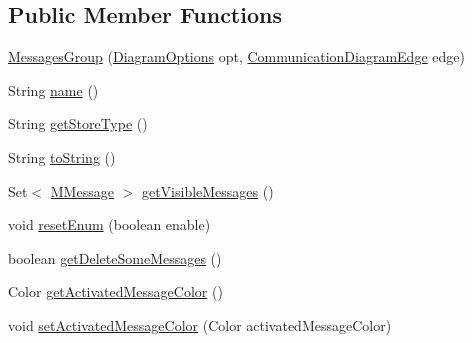 \subsection*{Public Member Functions}
\begin{DoxyCompactItemize}
\item 
\hyperlink{classorg_1_1tzi_1_1use_1_1gui_1_1views_1_1diagrams_1_1behavior_1_1communicationdiagram_1_1_messages_group_a96ee34da109285f43b0a4684df2dbf99}{Messages\-Group} (\hyperlink{classorg_1_1tzi_1_1use_1_1gui_1_1views_1_1diagrams_1_1_diagram_options}{Diagram\-Options} opt, \hyperlink{classorg_1_1tzi_1_1use_1_1gui_1_1views_1_1diagrams_1_1behavior_1_1communicationdiagram_1_1_communication_diagram_edge}{Communication\-Diagram\-Edge} edge)
\item 
String \hyperlink{classorg_1_1tzi_1_1use_1_1gui_1_1views_1_1diagrams_1_1behavior_1_1communicationdiagram_1_1_messages_group_ac38e5eafcc0a1f94152ba56a017633b4}{name} ()
\item 
String \hyperlink{classorg_1_1tzi_1_1use_1_1gui_1_1views_1_1diagrams_1_1behavior_1_1communicationdiagram_1_1_messages_group_aeeee23754e18fae33a8dede654129e87}{get\-Store\-Type} ()
\item 
String \hyperlink{classorg_1_1tzi_1_1use_1_1gui_1_1views_1_1diagrams_1_1behavior_1_1communicationdiagram_1_1_messages_group_ab1415787e2cc82791316c1c4a0603460}{to\-String} ()
\item 
Set$<$ \hyperlink{classorg_1_1tzi_1_1use_1_1gui_1_1views_1_1diagrams_1_1behavior_1_1communicationdiagram_1_1_m_message}{M\-Message} $>$ \hyperlink{classorg_1_1tzi_1_1use_1_1gui_1_1views_1_1diagrams_1_1behavior_1_1communicationdiagram_1_1_messages_group_a2d1b563b42959f839252a22a7a370135}{get\-Visible\-Messages} ()
\item 
void \hyperlink{classorg_1_1tzi_1_1use_1_1gui_1_1views_1_1diagrams_1_1behavior_1_1communicationdiagram_1_1_messages_group_a8d1683a2b391014221c414e44493b172}{reset\-Enum} (boolean enable)
\item 
boolean \hyperlink{classorg_1_1tzi_1_1use_1_1gui_1_1views_1_1diagrams_1_1behavior_1_1communicationdiagram_1_1_messages_group_a606a26cb9fc25be84af94153a8312f9d}{get\-Delete\-Some\-Messages} ()
\item 
Color \hyperlink{classorg_1_1tzi_1_1use_1_1gui_1_1views_1_1diagrams_1_1behavior_1_1communicationdiagram_1_1_messages_group_ac254a62aef76371924c1cedb1a881156}{get\-Activated\-Message\-Color} ()
\item 
void \hyperlink{classorg_1_1tzi_1_1use_1_1gui_1_1views_1_1diagrams_1_1behavior_1_1communicationdiagram_1_1_messages_group_a736ca55bb0c92cfa475eb1b788919728}{set\-Activated\-Message\-Color} (Color activated\-Message\-Color)

\end{DoxyCompactItemize}
